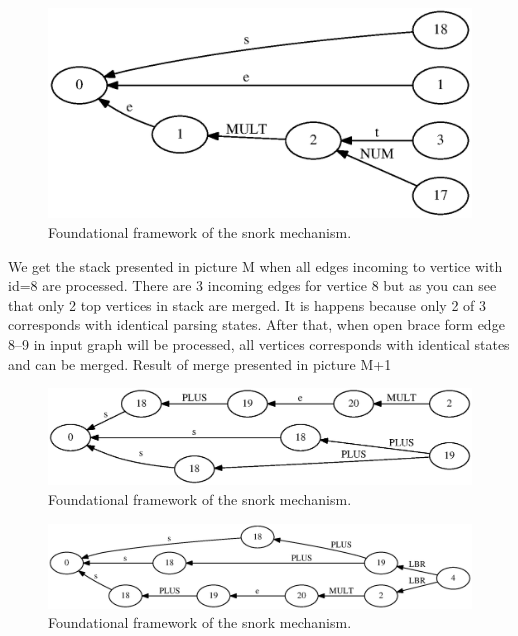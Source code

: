 \documentclass{sigplanconf}
\begin{document}
\begin{figure}
    \begin{center}
        \includegraphics[scale=0.6]{Graphs/stack_1_6.eps}
    \end{center}
    \caption{Foundational framework of the snork mechanism.}
    \label{fig-ffsm}
\end{figure}

We get the stack presented in picture M when all edges incoming to vertice with id=8 are processed. There are 3 incoming edges for vertice 8 but as you can see that only 2 top vertices in stack are merged. It is happens because only 2 of 3 corresponds with identical parsing states.  After that, when open brace form edge 8--9 in input graph will be processed, all vertices corresponds with identical states and can be merged. Result of merge presented in picture M+1

\begin{figure}[h]
    \begin{center}
        \includegraphics[scale=0.4]{Graphs/stack_4_9.eps}
    \end{center}
    \caption{Foundational framework of the snork mechanism.}
    \label{fig-ffsm}
\end{figure}

\begin{figure}
    \begin{center}
        \includegraphics[scale=0.3]{Graphs/stack_4_10.eps}
    \end{center}
    \caption{Foundational framework of the snork mechanism.}
    \label{fig-ffsm}
\end{figure}
\end{document}

